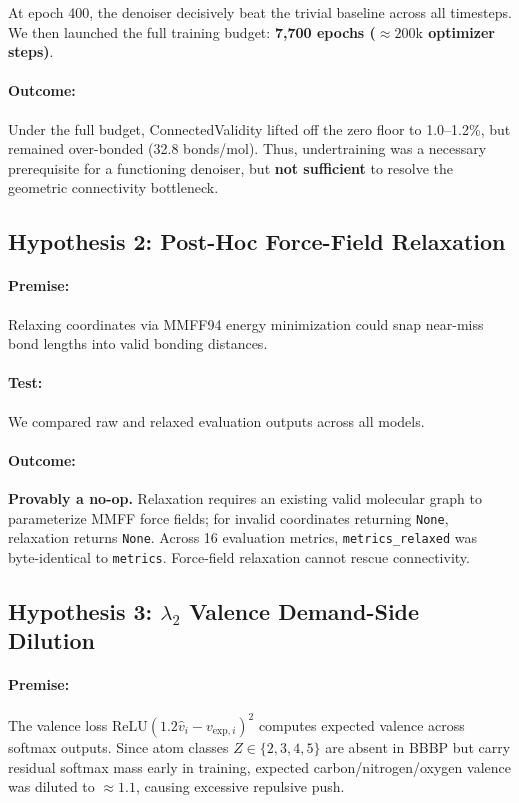 \documentclass[12pt, a4paper]{article}
\begin{document}
At epoch 400, the denoiser decisively beat the trivial baseline across all timesteps. We then launched the full training budget: \textbf{7,700 epochs ($\approx 200\text{k}$ optimizer steps)}.
\paragraph{Outcome:} Under the full budget, ConnectedValidity lifted off the zero floor to 1.0--1.2\%, but remained over-bonded (32.8 bonds/mol). Thus, undertraining was a necessary prerequisite for a functioning denoiser, but \textbf{not sufficient} to resolve the geometric connectivity bottleneck.

\subsection{Hypothesis 2: Post-Hoc Force-Field Relaxation}
\paragraph{Premise:} Relaxing coordinates via MMFF94 energy minimization could snap near-miss bond lengths into valid bonding distances.
\paragraph{Test:} We compared raw and relaxed evaluation outputs across all models.
\paragraph{Outcome:} \textbf{Provably a no-op.} Relaxation requires an existing valid molecular graph to parameterize MMFF force fields; for invalid coordinates returning \texttt{None}, relaxation returns \texttt{None}. Across 16 evaluation metrics, \texttt{metrics\_relaxed} was byte-identical to \texttt{metrics}. Force-field relaxation cannot rescue connectivity.

\subsection{Hypothesis 3: \texorpdfstring{$\lambda_2$}{lambda2} Valence Demand-Side Dilution}
\paragraph{Premise:} The valence loss $\text{ReLU}(1.2 \hat{v}_i - v_{\text{exp}, i})^2$ computes expected valence across softmax outputs. Since atom classes $Z \in \{2, 3, 4, 5\}$ are absent in BBBP but carry residual softmax mass early in training, expected carbon/nitrogen/oxygen valence was diluted to $\approx 1.1$, causing excessive repulsive push.
\end{document}
